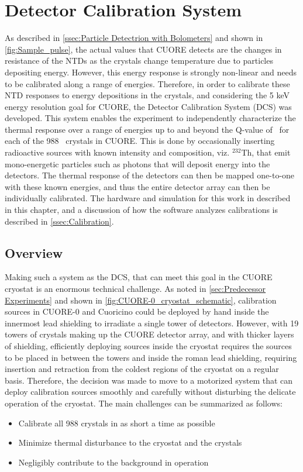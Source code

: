\chapter{Detector Calibration System}
\label{chap:DCS}

As described in \autoref{ssec:Particle Detectrion with Bolometers} and shown in \autoref{fig:Sample_pulse}, the actual values that CUORE detects are the changes in resistance of the NTDs as the crystals change temperature due to particles depositing energy.
However, this energy response is strongly non-linear and needs to be calibrated along a range of energies.
Therefore, in order to calibrate these NTD responses to energy depositions in the crystals, and considering the 5 keV energy resolution goal for CUORE, the Detector Calibration System (DCS) was developed.
This system enables the experiment to independently characterize the thermal response over a range of energies up to and beyond the Q-value of \zeronubb~for each of the 988 \teotwo~crystals in CUORE.
This is done by occasionally inserting radioactive sources with known intensity and composition, viz. $^{232}$Th, that emit mono-energetic particles such as photons that will deposit energy into the detectors.
The thermal response of the detectors can then be mapped one-to-one with these known energies, and thus the entire detector array can then be individually calibrated. The hardware and simulation for this work in described in this chapter, and a discussion of how the software analyzes calibrations is described in \autoref{ssec:Calibration}.

\section{Overview}
\label{sec:DCS_Overview}

Making such a system as the DCS, that can meet this goal in the CUORE cryostat is an enormous technical challenge.
As noted in \autoref{sec:Predecessor Experiments} and shown in \autoref{fig:CUORE-0_cryostat_schematic}, calibration sources in CUORE-0 and Cuoricino could be deployed by hand inside the innermost lead shielding to irradiate a single tower of detectors.
However, with 19 towers of crystals making up the CUORE detector array, and with thicker layers of shielding, efficiently deploying sources inside the cryostat requires the sources to be placed in between the towers and inside the roman lead shielding, requiring insertion and retraction from the coldest regions of the cryostat on a regular basis.
Therefore, the decision was made to move to a motorized system that can deploy calibration sources smoothly and carefully without disturbing the delicate operation of the cryostat.
The main challenges can be summarized as follows: 
\begin{itemize}
\item Calibrate all 988 crystals in as short a time as possible
\item Minimize thermal disturbance to the cryostat and the crystals
\item Negligibly contribute to the background in operation
\end{itemize}


